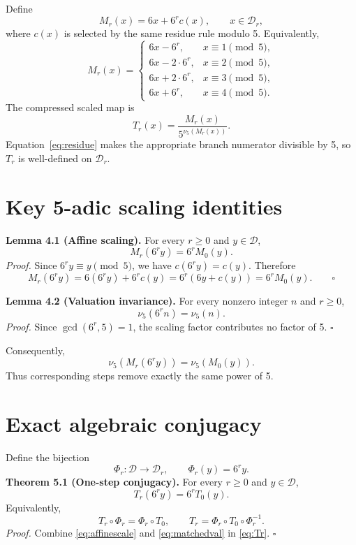 \documentclass[11pt]{article}
\begin{document}
Define
\begin{equation}M_r(x)=6x+6^r c(x),\qquad x\in\mathcal D_r,\label{eq:Mr}\end{equation}
where $c(x)$ is selected by the same residue rule modulo 5. Equivalently,
\[
M_r(x)=\begin{cases}
6x-6^r,&x\equiv1\pmod5,\\
6x-2\cdot6^r,&x\equiv2\pmod5,\\
6x+2\cdot6^r,&x\equiv3\pmod5,\\
6x+6^r,&x\equiv4\pmod5.
\end{cases}
\]
The compressed scaled map is
\begin{equation}T_r(x)=\frac{M_r(x)}{5^{\nu_5(M_r(x))}}.\label{eq:Tr}\end{equation}
Equation~\eqref{eq:residue} makes the appropriate branch numerator divisible by 5, so $T_r$ is well-defined on $\mathcal D_r$.

\section{Key 5-adic scaling identities}
\textbf{Lemma 4.1 (Affine scaling).} For every $r\ge0$ and $y\in\mathcal D$,
\begin{equation}M_r(6^r y)=6^rM_0(y).\label{eq:affinescale}\end{equation}
\textit{Proof.} Since $6^r y\equiv y\pmod5$, we have $c(6^r y)=c(y)$. Therefore
\[
M_r(6^r y)=6(6^r y)+6^r c(y)=6^r(6y+c(y))=6^rM_0(y).\qquad\square
\]

\textbf{Lemma 4.2 (Valuation invariance).} For every nonzero integer $n$ and $r\ge0$,
\begin{equation}\nu_5(6^r n)=\nu_5(n).\label{eq:valinv}\end{equation}
\textit{Proof.} Since $\gcd(6^r,5)=1$, the scaling factor contributes no factor of 5. \hfill$\square$

Consequently,
\begin{equation}\nu_5(M_r(6^r y))=\nu_5(M_0(y)).\label{eq:matchedval}\end{equation}
Thus corresponding steps remove exactly the same power of 5.

\section{Exact algebraic conjugacy}
Define the bijection
\[
\Phi_r:\mathcal D\to\mathcal D_r,\qquad \Phi_r(y)=6^r y.
\]
\textbf{Theorem 5.1 (One-step conjugacy).} For every $r\ge0$ and $y\in\mathcal D$,
\begin{equation}T_r(6^r y)=6^rT_0(y).\label{eq:conj}\end{equation}
Equivalently,
\[
T_r\circ\Phi_r=\Phi_r\circ T_0,\qquad T_r=\Phi_r\circ T_0\circ\Phi_r^{-1}.
\]
\textit{Proof.} Combine \eqref{eq:affinescale} and \eqref{eq:matchedval} in \eqref{eq:Tr}. \hfill$\square$
\end{document}
